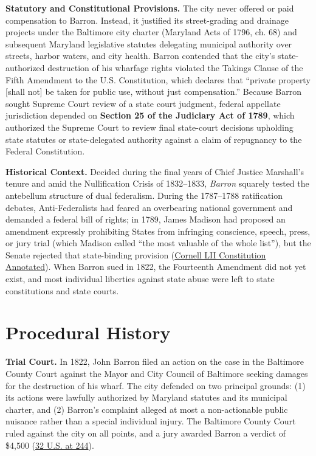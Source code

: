 \documentclass[12pt]{article}
\begin{document}
\textbf{Statutory and Constitutional Provisions.} The city never offered or paid compensation to Barron. Instead, it justified its street-grading and drainage projects under the Baltimore city charter (Maryland Acts of 1796, ch. 68) and subsequent Maryland legislative statutes delegating municipal authority over streets, harbor waters, and city health. Barron contended that the city's state-authorized destruction of his wharfage rights violated the Takings Clause of the Fifth Amendment to the U.S. Constitution, which declares that ``private property [shall not] be taken for public use, without just compensation.'' Because Barron sought Supreme Court review of a state court judgment, federal appellate jurisdiction depended on \textbf{Section 25 of the Judiciary Act of 1789}, which authorized the Supreme Court to review final state-court decisions upholding state statutes or state-delegated authority against a claim of repugnancy to the Federal Constitution.

\textbf{Historical Context.} Decided during the final years of Chief Justice Marshall's tenure and amid the Nullification Crisis of 1832--1833, \textit{Barron} squarely tested the antebellum structure of dual federalism. During the 1787--1788 ratification debates, Anti-Federalists had feared an overbearing national government and demanded a federal bill of rights; in 1789, James Madison had proposed an amendment expressly prohibiting States from infringing conscience, speech, press, or jury trial (which Madison called ``the most valuable of the whole list''), but the Senate rejected that state-binding provision (\href{https://www.law.cornell.edu/constitution-conan/amendment-14/overview-of-incorporation-of-the-bill-of-rights}{Cornell LII Constitution Annotated}). When Barron sued in 1822, the Fourteenth Amendment did not yet exist, and most individual liberties against state abuse were left to state constitutions and state courts.

\section{Procedural History}

\textbf{Trial Court.} In 1822, John Barron filed an action on the case in the Baltimore County Court against the Mayor and City Council of Baltimore seeking damages for the destruction of his wharf. The city defended on two principal grounds: (1) its actions were lawfully authorized by Maryland statutes and its municipal charter, and (2) Barron's complaint alleged at most a non-actionable public nuisance rather than a special individual injury. The Baltimore County Court ruled against the city on all points, and a jury awarded Barron a verdict of \$4,500 (\href{https://supreme.justia.com/cases/federal/us/32/243/}{32 U.S. at 244}).
\end{document}
